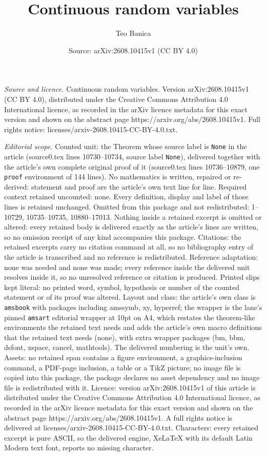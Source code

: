 \documentclass[10pt,a4paper]{amsart}
\title[Continuous random variables]{Continuous random variables}
\author{Teo Banica}
\date{Source: arXiv:2608.10415v1 (CC BY 4.0)}
\begin{document}
\maketitle

\noindent\emph{Source and licence.} Continuous random variables. Version arXiv:2608.10415v1 (CC BY 4.0), distributed under the Creative Commons Attribution 4.0 International licence, as recorded in the arXiv licence metadata for this exact version and shown on the abstract page https://arxiv.org/abs/2608.10415v1. Full rights notice: licenses/arxiv-2608.10415-CC-BY-4.0.txt.\par\smallskip

\noindent\textit{Editorial scope.} Counted unit: the Theorem whose source label is \texttt{None} in the article (source0.tex lines 10730--10734, source label \texttt{None}), delivered together with the article's own complete original proof of it (source0.tex lines 10736--10879, one \texttt{proof} environment of 144 lines). No mathematics is written, repaired or re-derived: statement and proof are the article's own text line for line. Required context retained uncounted: none. Every definition, display and label of those lines is retained unchanged. Omitted from this package and not redistributed: 1--10729, 10735--10735, 10880--17013. Nothing inside a retained excerpt is omitted or altered: every retained body is delivered exactly as the article's lines are written, so no omission receipt of any kind accompanies this package. Citations: the retained excerpts carry no citation command at all, so no bibliography entry of the article is transcribed and no reference is redistributed. Reference adaptation: none was needed and none was made; every reference inside the delivered unit resolves inside it, so no unresolved reference or citation is produced. Printed slips kept literal: no printed word, symbol, hypothesis or number of the counted statement or of its proof was altered. Layout and class: the article's own class is \texttt{amsbook} with packages including amssymb, xy, hyperref; the wrapper is the lane's pinned \texttt{amsart} editorial wrapper at 10pt on A4, which restates the theorem-like environments the retained text needs and adds the article's own macro definitions that the retained text needs (none), with extra wrapper packages (bm, bbm, dsfont, xspace, cancel, mathtools). The delivered numbering is the unit's own. Assets: no retained span contains a figure environment, a graphics-inclusion command, a PDF-page inclusion, a table or a TikZ picture; no image file is copied into this package, the package declares no asset dependency and no image file is redistributed with it. Licence: version arXiv:2608.10415v1 of this article is distributed under the Creative Commons Attribution 4.0 International licence, as recorded in the arXiv licence metadata for this exact version and shown on the abstract page https://arxiv.org/abs/2608.10415v1. A full rights notice is delivered at licenses/arxiv-2608.10415-CC-BY-4.0.txt. Characters: every retained excerpt is pure ASCII, so the delivered engine, XeLaTeX with its default Latin Modern text font, reports no missing character.
\end{document}
